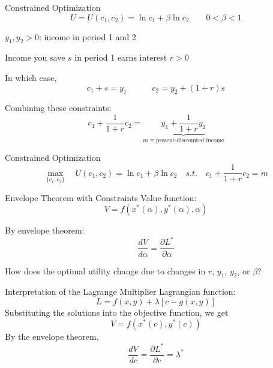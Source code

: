 \documentclass{./../../Latex/teaching_slides}
\begin{document}
\begin{frame}{Constrained Optimization}
\vspace{-1.25em}
$$ 	U = U(c_1, c_2) =  \ln c_1 + \beta \ln c_2 \quad \quad 0<\beta<1$$
\vspace{-0.65em}
\begin{witemize}
  \item $y_1,y_2>0$: income in period 1 and 2
  \item Income you save $s$ in period 1 earns interest $r>0$
  \item In which case,
 $$ c_1 + s = y_1 \quad \quad \quad  c_2 = y_2 + (1+r) s $$
 \item Combining these constraints:
$$ c_1 + \frac{1}{1+r} c_2 = \underbrace{y_1 + \frac{1}{1+r} y_2}_{m \equiv \text{present-discounted income}}$$
\end{witemize}
\end{frame}

\begin{frame}{Constrained Optimization}
\vspace{-1.5em}
$$ \max_{\{c_1,c_2\}} \quad U(c_1, c_2) = \ln c_1 + \beta \ln c_2 \quad s.t. \quad c_1 + \frac{1}{1+r} c_2 = m $$
\end{frame}


\begin{frame}{Envelope Theorem with Constraints}
Value function:
$$
V=f\left(x^{*}(\alpha), y^{*}(\alpha), \alpha\right)
$$

\vspace{0.5em}
By envelope theorem:
$$
\frac{d V}{d \alpha}=\frac{\partial L^{*}}{\partial \alpha}
$$

\vspace{2em}
How does the optimal utility change due to changes in $r$, $y_1$, $y_2$, or $\beta$?
\end{frame}

\begin{frame}{Interpretation of the Lagrange Multiplier}
Lagrangian function:
$$
L=f(x, y )+\lambda [c-g(x, y)]
$$
Substituting the solutions into the objective function, we get
$$
V = f(x^{*}(c), y^{*}(c))
$$
By the envelope theorem,
$$
\frac{d V}{d c}=\frac{\partial L^{*}}{\partial c}=\lambda^*
$$
\end{frame}
\end{document}
